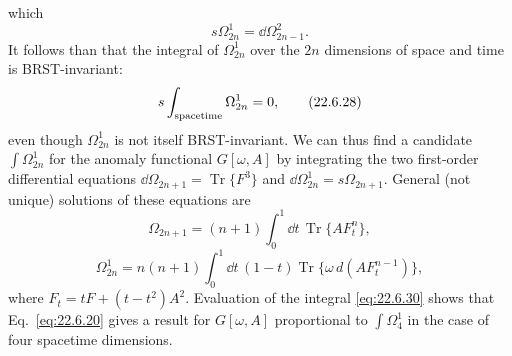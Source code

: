 which
\begin{equation}
 s\Omega^1_{2n}=\dd\Omega^2_{2n-1}.
 \tag{22.6.27}\label{eq:22.6.27}
\end{equation}
It follows than that the integral of $\Omega^1_{2n}$ over the $2n$
dimensions of space and time is BRST-invariant:
\begin{equation}
 s\int_{\rm spacetime}\Omega^1_{2n}=0,
 \tag{22.6.28}\label{eq:22.6.28}
\end{equation}
even though $\Omega^1_{2n}$ is not itself BRST-invariant. We can thus find
a candidate $\int\Omega^1_{2n}$ for the anomaly functional $G[\omega,A]$
by integrating the two first-order differential equations
$\dd\Omega_{2n+1}=\operatorname{Tr}\{F^3\}$ and
$\dd\Omega^1_{2n}=s\Omega_{2n+1}$. General (not unique) solutions of these
equations are
\begin{equation}
 \Omega_{2n+1}
 =(n+1)\int_0^1\dd t\,\operatorname{Tr}\{AF_t^n\},
 \tag{22.6.29}\label{eq:22.6.29}
\end{equation}
\begin{equation}
 \Omega^1_{2n}
 =n(n+1)\int_0^1\dd t\,(1-t)
 \operatorname{Tr}\{\omega\,d(AF_t^{n-1})\},
 \tag{22.6.30}\label{eq:22.6.30}
\end{equation}
where $F_t=tF+(t-t^2)A^2$. Evaluation of the integral \eqref{eq:22.6.30}
shows that Eq.~\eqref{eq:22.6.20} gives a result for $G[\omega,A]$
proportional to $\int\Omega^1_4$ in the case of four spacetime dimensions.

